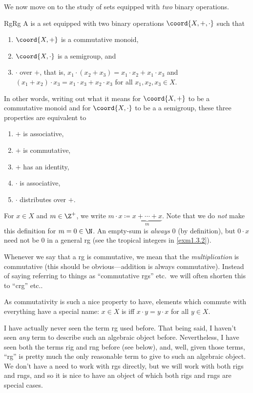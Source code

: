 We now move on to the study of sets equipped with \emph{two} binary operations.
\begin{dfn}{Rg}{Rg}
A  is a set equipped with two binary operations $\coord{X,+,\cdot}$ such that
\begin{enumerate}
\item $\coord{X,+}$ is a commutative monoid,
\item $\coord{X,\cdot}$ is a semigroup, and
\item $\cdot$  over $+$, that is, $x_1\cdot (x_2+x_3)=x_1\cdot x_2+x_1\cdot x_3$ and $(x_1+x_2)\cdot x_3=x_1\cdot x_3+x_2\cdot x_3$ for all $x_1,x_2,x_3\in X$.
\end{enumerate}
\begin{rmk}
In other words, writing out what it means for $\coord{X,+}$ to be a commutative monoid and for $\coord{X,\cdot}$ to be a a semigroup, these three properties are equivalent to
\begin{enumerate}
\item $+$ is associative,
\item $+$ is commutative,
\item $+$ has an identity,
\item $\cdot$ is associative,
\item $\cdot$ distributes over $+$.
\end{enumerate}
\end{rmk}
\begin{rmk}
For $x\in X$ and $m\in \Z ^+$, we write $m\cdot x\coloneqq \underbrace{x+\cdots +x}_{m}$.  Note that we do \emph{not} make this definition for $m=0\in \N$.  An empty-sum is \emph{always} $0$ (by definition), but $0\cdot x$ need not be $0$ in a general rg (see the tropical integers in \cref{exm1.3.2}).
\end{rmk}
\begin{rmk}
Whenever we say that a rg is commutative, we mean that the \emph{multiplication} is commutative (this should be obvious---addition is always commutative).  Instead of saying referring to things as ``commutative rgs'' etc.~we will often shorten this to ``crg'' etc..

As commutativity is such a nice property to have, elements which commute with everything have a special name:  $x\in X$ is  iff $x\cdot y=y\cdot x$ for all $y\in X$.
\end{rmk}
\begin{rmk}
I have actually never seen the term rg used before.  That being said, I haven't seen \emph{any} term to describe such an algebraic object before.  Nevertheless, I have seen both the terms rig and rng before (see below), and, well, given those terms, ``rg'' is pretty much the only reasonable term to give to such an algebraic object.  We don't have a need to work with rgs directly, but we will work with both rigs and rngs, and so it is nice to have an object of which both rigs and rngs are special cases.
\end{rmk}
\end{dfn}
